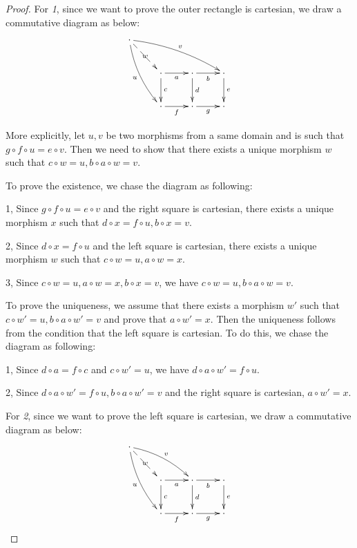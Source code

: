   \begin{proof}
    For \emph{1}, since we want to prove the outer rectangle is cartesian, we draw a commutative diagram as below:
    \begin{displaymath}
      \xymatrix{
         \cdot\ar@/_/[ddr]_{u}\ar@/^/[rrrd]^{v}\ar@{-->}[dr]|{w}&&&\\
         &\cdot\ar[r]_{a}\ar[d]^{c}&\cdot\ar[r]_{b}\ar[d]^{d}&\cdot\ar[d]^{e}\\
         &\cdot\ar[r]_{f}&\cdot\ar[r]_{g}&\cdot
      }
    \end{displaymath}

    More explicitly, let $u,v$ be two morphisms from a same domain and is such that $g\circ f\circ u=e\circ v$. Then we need to show that there exists a unique morphism $w$ such that $c\circ w=u, b\circ a\circ w=v$.

    To prove the existence, we chase the diagram as following:

    1, Since $g\circ f\circ u=e\circ v$ and the right square is cartesian, there exists a unique morphism $x$ such that $d\circ x=f\circ u, b\circ x=v$.

    2, Since $d\circ x=f\circ u$ and the left square is cartesian, there exists a unique morphism $w$ such that $c\circ w=u, a\circ w=x$.

    3, Since $c\circ w=u, a\circ w=x, b\circ x=v$, we have $c\circ w=u, b\circ a\circ w=v$.

    To prove the uniqueness, we assume that there exists a morphism $w'$ such that $c\circ w'=u, b\circ a\circ w'=v$ and prove that $a\circ w'=x$. Then the uniqueness follows from the condition that the left square is cartesian.
    To do this, we chase the diagram as following:

    1, Since $d\circ a=f\circ c$ and $c\circ w'=u$, we have $d\circ a\circ w'=f\circ u$.

    2, Since $d\circ a\circ w'=f\circ u, b\circ a\circ w'=v$ and the right square is cartesian, $a\circ w'=x$.

    For \emph{2}, since we want to prove the left square is cartesian, we draw a commutative diagram as below:
    \begin{displaymath}
      \xymatrix{
         \cdot\ar@/_/[ddr]_{u}\ar@/^/[rrd]^{v}\ar@{-->}[dr]|{w}&&&\\
         &\cdot\ar[r]_{a}\ar[d]^{c}&\cdot\ar[r]_{b}\ar[d]^{d}&\cdot\ar[d]^{e}\\
         &\cdot\ar[r]_{f}&\cdot\ar[r]_{g}&\cdot
      }
    \end{displaymath}


\end{proof}
